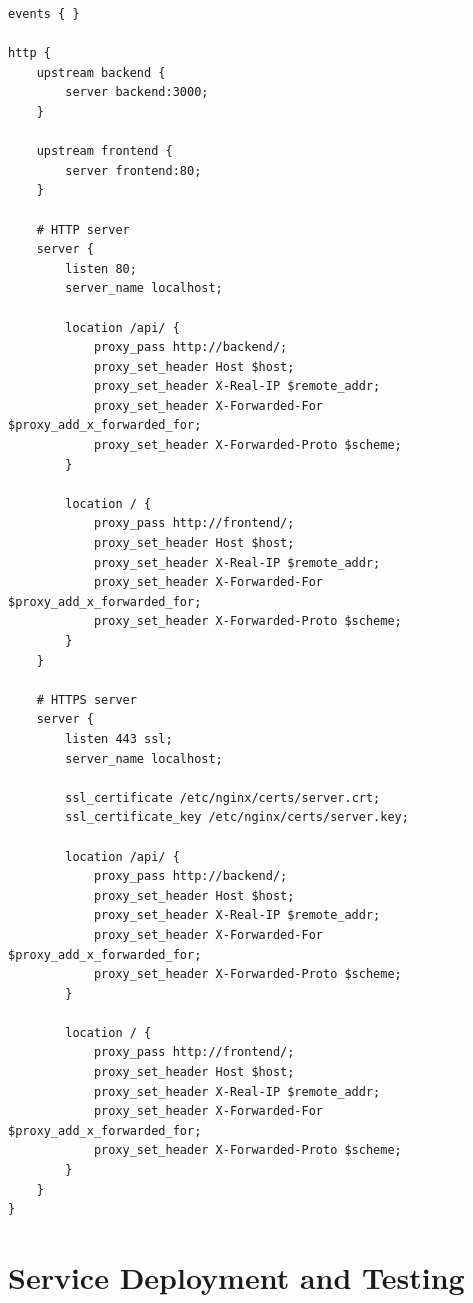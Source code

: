 \documentclass[12pt,a4paper]{article}
\begin{document}
\begin{tcolorbox}[colback=lightgray, colframe=orange, title=\textbf{Nginx Configuration with SSL}, fonttitle=\bfseries, coltitle=white, center title]
\begin{lstlisting}[style=Dockerfile, caption={nginx.conf - SSL Configuration}]
events { }

http {
    upstream backend {
        server backend:3000;
    }

    upstream frontend {
        server frontend:80;
    }

    # HTTP server
    server {
        listen 80;
        server_name localhost;

        location /api/ {
            proxy_pass http://backend/;
            proxy_set_header Host $host;
            proxy_set_header X-Real-IP $remote_addr;
            proxy_set_header X-Forwarded-For $proxy_add_x_forwarded_for;
            proxy_set_header X-Forwarded-Proto $scheme;
        }

        location / {
            proxy_pass http://frontend/;
            proxy_set_header Host $host;
            proxy_set_header X-Real-IP $remote_addr;
            proxy_set_header X-Forwarded-For $proxy_add_x_forwarded_for;
            proxy_set_header X-Forwarded-Proto $scheme;
        }
    }

    # HTTPS server
    server {
        listen 443 ssl;
        server_name localhost;

        ssl_certificate /etc/nginx/certs/server.crt;
        ssl_certificate_key /etc/nginx/certs/server.key;

        location /api/ {
            proxy_pass http://backend/;
            proxy_set_header Host $host;
            proxy_set_header X-Real-IP $remote_addr;
            proxy_set_header X-Forwarded-For $proxy_add_x_forwarded_for;
            proxy_set_header X-Forwarded-Proto $scheme;
        }

        location / {
            proxy_pass http://frontend/;
            proxy_set_header Host $host;
            proxy_set_header X-Real-IP $remote_addr;
            proxy_set_header X-Forwarded-For $proxy_add_x_forwarded_for;
            proxy_set_header X-Forwarded-Proto $scheme;
        }
    }
}
\end{lstlisting}
\end{tcolorbox}

\newpage

\section{Service Deployment and Testing}
\end{document}
